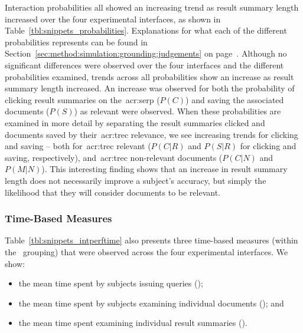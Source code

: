 Interaction probabilities all showed an increasing trend as result summary length increased over the four experimental interfaces, as shown in Table~\ref{tbl:snippets_probabilities}. Explanations for what each of the different probabilities represents can be found in Section~\ref{sec:method:simulation:grounding:judgements} on page~\pageref{sec:method:simulation:grounding:judgements}. Although no significant differences were observed over the four interfaces and the different probabilities examined, trends across all probabilities show an increase as result summary length increased. An increase was observed for both the probability of clicking result summaries on the~\gls{acr:serp} ($P(C)$) and saving the associated documents ($P(S)$) as relevant were observed. When these probabilities are examined in more detail by separating the result summaries clicked and documents saved by their~\gls{acr:trec} relevance, we see increasing trends for clicking and saving -- both for~\gls{acr:trec} relevant ($P(C|R)$ and $P(S|R)$ for clicking and saving, respectively), and~\gls{acr:trec} non-relevant documents ($P(C|N)$ and $P(M|N)$). This interesting finding shows that an increase in result summary length does not necessarily improve a subject's accuracy, but simply the likelihood that they will consider documents to be relevant.


\subsubsection{Time-Based Measures}\label{chap:snippets:user:results:time}
Table~\ref{tbl:snippets_intperftime} also presents three time-based measures (within the ~grouping) that were observed across the four experimental interfaces. We show:

\begin{itemize}
    \item{the mean time spent by subjects issuing queries ();}
    \item{the mean time spent by subjects examining individual documents (); and}
    \item{the mean time spent examining individual result summaries ().}
\end{itemize}

